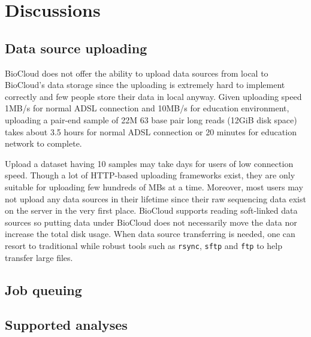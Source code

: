 \chapter{Discussions}
\label{c:discussion}


\section{Data source uploading}

BioCloud does not offer the ability to upload data sources from local to
BioCloud's data storage since the uploading is extremely hard to implement
correctly and few people store their data in local anyway. Given uploading
speed 1MB/s for normal ADSL connection and 10MB/s for education environment,
uploading a pair-end sample of 22M 63 base pair long reads (12GiB disk space)
takes about 3.5 hours for normal ADSL connection or 20 minutes for education
network to complete.

Upload a dataset having 10 samples may take days for users of low connection
speed. Though a lot of HTTP-based uploading frameworks exist, they are only
suitable for uploading few hundreds of MBs at a time. Moreover, most users may
not upload any data sources in their lifetime since their raw sequencing data
exist on the server in the very first place. BioCloud supports reading
soft-linked data sources so putting data under BioCloud does not necessarily
move the data nor increase the total disk usage. When data source transferring
is needed, one can resort to traditional while robust tools  such as
\texttt{rsync}, \texttt{sftp} and \texttt{ftp} to help transfer large files.


\section{Job queuing}




\section{Supported analyses}




